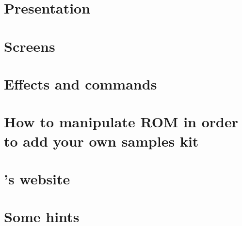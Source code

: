 \documentclass[12pt,a4paper]{article}
\begin{document}
  \section{Presentation}
  

  \newpage
  \section{Screens}
  

  \newpage
  \section{Effects and commands}
  

  \newpage
  \section{How to manipulate ROM in order to add your own samples kit}
  

  \newpage
  \section{\FAT's website}
  

  \newpage
  \section{Some hints}
  
\end{document}
